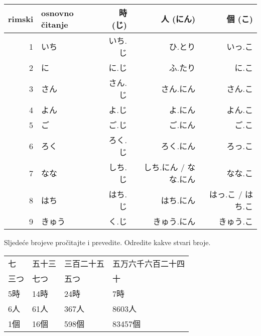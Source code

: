 	\begin{table}[h]
		\centering
		\begin{tabular}{r l r r r}\toprule[2pt]
			rimski & osnovno čitanje & 時 (じ) & 人 (にん) & 個 (こ)\\
			\midrule
			1			& いち & いち.じ & ひ.とり\footnotemark[2] & \colorbox{blue!10}{いっ.こ} \\
			2			& に & に.じ & ふ.たり\footnotemark[2] & に.こ \\
			3			& さん & さん.じ & さん.にん & さん.こ \\
			4			& よん & \colorbox{blue!10}{よ.じ} & \colorbox{blue!10}{よ.にん} & よん.こ \\
			5			& ご & ご.じ & ご.にん & ご.こ \\
			6			& ろく & ろく.じ & ろく.にん & \colorbox{blue!10}{ろっ.こ} \\
			7			& なな & \colorbox{blue!10}{しち.じ} & しち.にん / なな.にん & なな.こ \\
			8			& はち & はち.じ & はち.にん & \colorbox{blue!10}{はっ.こ} / はち.こ \\
			9			& きゅう & \colorbox{blue!10}{く.じ} & きゅう.にん & きゅう.こ \\
			\bottomrule
		\end{tabular}
	\end{table}

	
	Sljedeće brojeve pročitajte i prevedite. Odredite kakve stvari broje.
	
	\vspace{5pt}
	\begin{tabular}{l l l l}
		七	&	五十三	&	三百二十五	&	五万六千六百二十四	\\
		三つ	&	七つ	&	五つ			&	十	\\
		5時	&	14時	&	24時			&	7時	\\
		6人	&	61人	&	367人		&	8603人	\\
		1個	&	16個	&	598個		&	83457個	\\
	\end{tabular}

	
